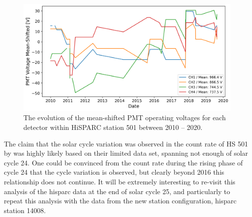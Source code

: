 \begin{figure}[ht!]
	\includegraphics[width=\columnwidth]{HS_501_voltages_c24.png}
	\caption{The evolution of the mean-shifted PMT operating voltages for each detector within HiSPARC station 501 between 2010 -- 2020.}
	\label{fig:HS_501_voltages_c24}
\end{figure}

The claim that the solar cycle variation was observed in the count rate of HS 501 by \citet{fan_analysis_2018} was highly likely based on their limited data set, spanning not enough of solar cycle 24. One could be convinced from the count rate during the rising phase of cycle 24 that the cycle variation is observed, but clearly beyond 2016 this relationship does not continue. It will be extremely interesting to re-visit this analysis of the \gls{hisparc} data at the end of solar cycle 25, and particularly to repeat this analysis with the data from the new station configuration, \gls{hisparc} station 14008.

